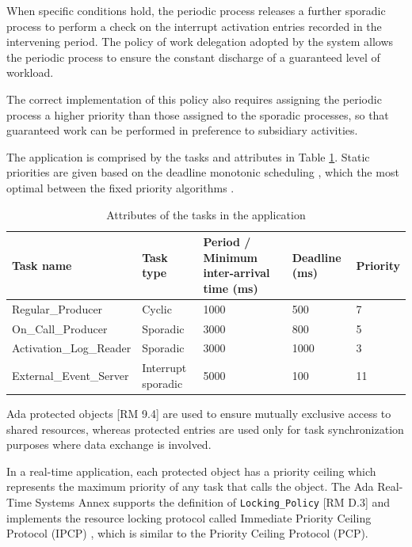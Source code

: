 \documentclass{article}
\begin{document}
When specific conditions hold, the periodic process releases a further sporadic process to perform a check on the interrupt activation entries recorded in the intervening period. The policy of work delegation adopted by the system allows the periodic process to ensure the constant discharge of a guaranteed level of workload.

The correct implementation of this policy also requires assigning the periodic process a higher priority than those assigned to the sporadic processes, so that guaranteed work can be performed in preference to subsidiary activities.

The application is comprised by the tasks and attributes in Table \ref{tab:tasks-attributes}. Static priorities are given based on the deadline monotonic scheduling \cite{rm-dm}, which the most optimal between the fixed priority algorithms \cite{optimality-rm-dm}.

\begin{table}[!htbp]
   \centering
   \begin{tabular}{lllll}
     \toprule
     Task name & Task type & Period / Minimum inter-arrival time (ms) & Deadline (ms) & Priority  \\
     \midrule
     Regular\_Producer & Cyclic & 1000 & 500 & 7 \\
     On\_Call\_Producer & Sporadic & 3000 & 800 & 5 \\
     Activation\_Log\_Reader & Sporadic & 3000 & 1000 & 3 \\
     External\_Event\_Server & Interrupt sporadic & 5000 & 100 & 11 \\
     \bottomrule
   \end{tabular}
   \caption{Attributes of the tasks in the application \cite{ycs}}
   \label{tab:tasks-attributes}
\end{table}

Ada protected objects [RM 9.4] are used to ensure mutually exclusive access to shared resources, whereas protected entries are used only for task synchronization purposes where data exchange is involved.

In a real-time application, each protected object has a priority ceiling which represents the maximum priority of any task that calls the object. The Ada Real-Time Systems Annex supports the definition of  \texttt{Locking\_Policy} [RM D.3] and implements the resource locking protocol called Immediate Priority Ceiling Protocol (IPCP) \cite{ada-pcp}, which is similar to the Priority Ceiling Protocol (PCP).
\end{document}
